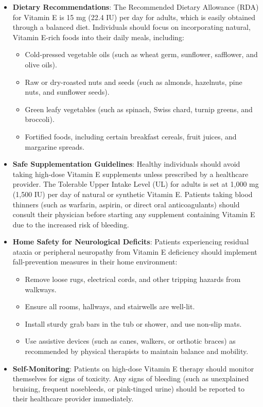 \begin{itemize}
    \item \textbf{Dietary Recommendations}: The Recommended Dietary Allowance (RDA) for Vitamin E is 15 mg (22.4 IU) per day for adults, which is easily obtained through a balanced diet. Individuals should focus on incorporating natural, Vitamin E-rich foods into their daily meals, including:
    \begin{itemize}
        \item Cold-pressed vegetable oils (such as wheat germ, sunflower, safflower, and olive oils).
        \item Raw or dry-roasted nuts and seeds (such as almonds, hazelnuts, pine nuts, and sunflower seeds).
        \item Green leafy vegetables (such as spinach, Swiss chard, turnip greens, and broccoli).
        \item Fortified foods, including certain breakfast cereals, fruit juices, and margarine spreads.
    \end{itemize}
    \item \textbf{Safe Supplementation Guidelines}: Healthy individuals should avoid taking high-dose Vitamin E supplements unless prescribed by a healthcare provider. The Tolerable Upper Intake Level (UL) for adults is set at 1,000 mg (1,500 IU) per day of natural or synthetic Vitamin E. Patients taking blood thinners (such as warfarin, aspirin, or direct oral anticoagulants) should consult their physician before starting any supplement containing Vitamin E due to the increased risk of bleeding.
    \item \textbf{Home Safety for Neurological Deficits}: Patients experiencing residual ataxia or peripheral neuropathy from Vitamin E deficiency should implement fall-prevention measures in their home environment:
    \begin{itemize}
        \item Remove loose rugs, electrical cords, and other tripping hazards from walkways.
        \item Ensure all rooms, hallways, and stairwells are well-lit.
        \item Install sturdy grab bars in the tub or shower, and use non-slip mats.
        \item Use assistive devices (such as canes, walkers, or orthotic braces) as recommended by physical therapists to maintain balance and mobility.
    \end{itemize}
    \item \textbf{Self-Monitoring}: Patients on high-dose Vitamin E therapy should monitor themselves for signs of toxicity. Any signs of bleeding (such as unexplained bruising, frequent nosebleeds, or pink-tinged urine) should be reported to their healthcare provider immediately.
\end{itemize}

